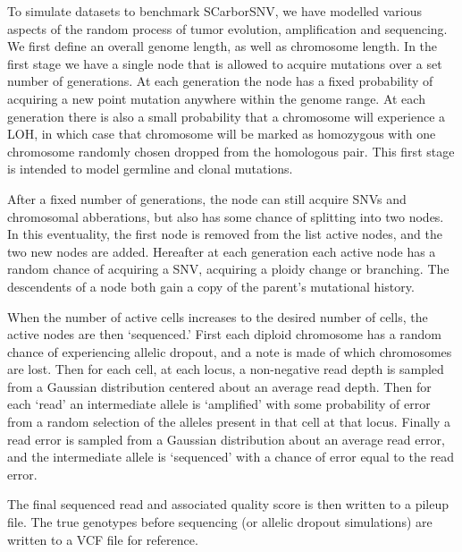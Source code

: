 \documentclass[../../main.tex]{subfiles}
\begin{document}
To simulate datasets to benchmark SCarborSNV, we have modelled various aspects of the random process of tumor evolution, amplification and sequencing.
We first define an overall genome length, as well as chromosome length.
In the first stage we have a single node that is allowed to acquire mutations over a set number of generations.
At each generation the node has a fixed probability of acquiring a new point mutation anywhere within the genome range.
At each generation there is also a small probability that a chromosome will experience a LOH, in which case that chromosome will be marked as homozygous with one chromosome randomly chosen dropped from the homologous pair.
This first stage is intended to model germline and clonal mutations.

After a fixed number of generations, the node can still acquire SNVs and chromosomal abberations, but also has some chance of splitting into two nodes.
In this eventuality, the first node is removed from the list active nodes, and the two new nodes are added.
Hereafter at each generation each active node has a random chance of acquiring  a SNV, acquiring a ploidy change or branching.
The descendents of a node both gain a copy of the parent's mutational history.

When the number of active cells increases to the desired number of cells, the active nodes are then `sequenced.'
First each diploid chromosome has a random chance of experiencing allelic dropout, and a note is made of which chromosomes are lost.
Then for each cell, at each locus, a non-negative read depth is sampled from a Gaussian distribution centered about an average read depth.
Then for each `read' an intermediate allele is `amplified' with some probability of error from a random selection of the alleles present in that cell at that locus.
Finally a read error is sampled from a Gaussian distribution about an average read error, and the intermediate allele is `sequenced' with a chance of error equal to the read error.

The final sequenced read and associated quality score is then written to a pileup file.
The true genotypes before sequencing (or allelic dropout simulations) are written to a VCF file for reference.
\end{document}
